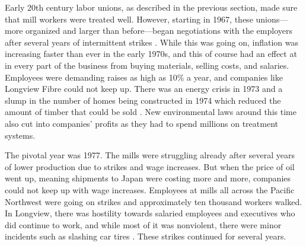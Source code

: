 Early 20th century labor unions, as described in the previous section, made sure that mill workers were treated well. However, starting in 1967, these unions—more organized and larger than before—began negotiations with the employers after several years of intermittent strikes \citep[196-198]{wilma_2017}. While this was going on, inflation was increasing faster than ever in the early 1970s, and this of course had an effect at in every part of the business from buying materials, selling costs, and salaries. Employees were demanding raises as high as 10\% a year, and companies like Longview Fibre could not keep up. There was an energy crisis in 1973 and a slump in the number of homes being constructed in 1974 which reduced the amount of timber that could be sold \citep[218]{wilma_2017}. New environmental laws around this time also cut into companies' profits as they had to spend millions on treatment systems.

The pivotal year was 1977. The mills were struggling already after several years of lower production due to strikes and wage increases. But when the price of oil went up, meaning shipments to Japan were costing more and more, companies could not keep up with wage increases. Employees at mills all across the Pacific Northwest were going on strikes and approximately ten thousand workers walked. In Longview, there was hostility towards salaried employees and executives who did continue to work, and while most of it was nonviolent, there were minor incidents such as slashing car tires \citep[200-202]{wilma_2017}. These strikes continued for several years.

